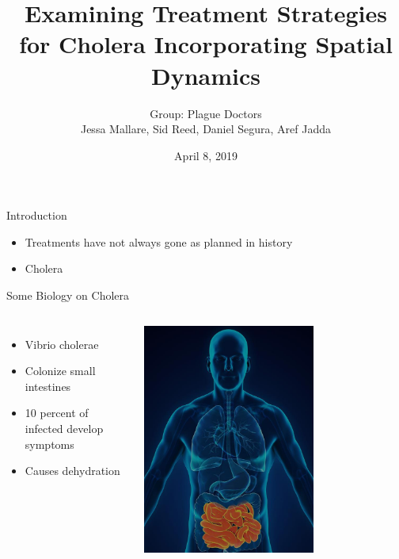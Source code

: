 \documentclass{beamer}\usepackage[]{graphicx}\usepackage[]{color}
\title[Modelling Cholera Treatments]
{Examining Treatment Strategies for Cholera Incorporating Spatial Dynamics}
\author[Plague Doctors]{Group: Plague Doctors \\ Jessa Mallare, Sid Reed, Daniel Segura, Aref Jadda}
\institute[McMaster]{McMaster University \and
Instructor: Dr. David Earn}
\date[April 8, 2019]{April 8, 2019}
\begin{document}
\begin{frame}
\titlepage
\end{frame}

\begin{frame}{Introduction}
\begin{itemize}
\setlength\itemsep{2em}
\item Treatments have not always gone as planned in history
\item Cholera
\end{itemize}
\end{frame}

\begin{frame}{Some Biology on Cholera}
\begin{columns}[onlytextwidth]
\begin{itemize}
\setlength\itemsep{2em}
\item Vibrio cholerae 
\item Colonize small intestines
\item 10 percent of infected develop symptoms
\item Causes dehydration
\end{itemize}
\includegraphics[width=0.65\textwidth]{images/SI.jpg}
\end{columns}
\end{frame}
\end{document}
